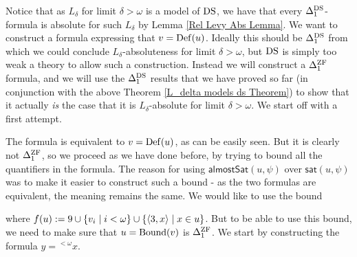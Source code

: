Notice that as $L_\delta$ for limit $\delta>\omega$ is a model of $\operatorname{DS}$, we have that every $\Delta_1^{\operatorname{DS}}$-formula is absolute for such $L_\delta$ by Lemma \ref{Rel Levy Abs Lemma}. We want to construct a formula expressing that $v=\operatorname{Def}(u)$. Ideally this should be $\Delta_1^{\operatorname{DS}}$ from which we could conclude $L_\delta$-absoluteness for limit $\delta>\omega$, but $\operatorname{DS}$ is simply too weak a theory to allow such a construction. Instead we will construct a $\Delta_1^{\operatorname{ZF}}$ formula, and we will use the $\Delta_1^{\operatorname{DS}}$ results that we have proved so far (in conjunction with the above Theorem \ref{L_delta models ds Theorem}) to show that it actually \textit{is} the case that it is $L_\delta$-absolute for limit $\delta>\omega$. We start off with a first attempt.

The formula is equivalent to $v=\operatorname{Def}(u)$, as can be easily seen. But it is clearly not $\Delta_1^{\operatorname{ZF}}$, so we proceed as we have done before, by trying to bound all the quantifiers in the formula. The reason for using $\mathsf{almostSat}(u,\psi)$ over $\mathsf{sat}(u,\psi)$ was to make it easier to construct such a bound - as the two formulas are equivalent, the meaning remains the same. We would like to use the bound

where $f(u):=9\cup\{v_i\mid i<\omega\}\cup\{\langle 3,x\rangle\mid x\in u\}$. But to be able to use this bound, we need to make sure that $u=\operatorname{Bound}(v)$ is $\Delta_1^{\operatorname{ZF}}$. We start by constructing the formula $y={^{<\omega}} x$.

